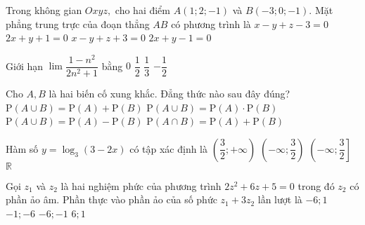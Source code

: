 \begin{ex}%
	Trong không gian $ Oxyz, $ cho hai điểm $ A(1;2;-1) $ và $ B(-3;0;-1) $. Mặt phẳng trung trực của đoạn thẳng $ AB $ có phương trình là
	\choice
	{$ x-y+z-3=0 $}
	{\True $ 2x+y+1=0 $}
	{$ x-y+z+3=0 $}
	{$ 2x+y-1=0 $}
\end{ex}

\begin{ex}%
	Giới hạn $ \lim\dfrac{1-n^2}{2n^2+1}$ bằng
	\choice
	{$ 0 $}
	{$ \dfrac{1}{2} $}
	{$ \dfrac{1}{3} $}
	{\True $ -\dfrac{1}{2} $}
\end{ex}

\begin{ex}%
	Cho $ A,B $ là hai biến cố xung khắc. Đẳng thức nào sau đây đúng?
	\choice
	{\True $ \mathrm{P}(A\cup B)=\mathrm{P}(A)+\mathrm{P}(B) $}
	{$ \mathrm{P}(A\cup B)=\mathrm{P}(A)\cdot\mathrm{P}(B) $}
	{$ \mathrm{P}(A\cup B)=\mathrm{P}(A)-\mathrm{P}(B) $}
	{$ \mathrm{P}(A\cap B)=\mathrm{P}(A)+\mathrm{P}(B) $}
\end{ex}

\begin{ex}%
	Hàm số $ y=\log_3 (3-2x) $ có tập xác định là
	\choice
	{$ \left( \dfrac{3}{2};+\infty \right)  $}
	{\True $\left(-\infty;\dfrac{3}{2} \right) $}
	{$ \left( -\infty;\dfrac{3}{2}\right]  $}
	{$ \mathbb{R} $}
\end{ex}

\begin{ex}%
	Gọi $ z_1 $ và $ z_2 $ là hai nghiệm phức của phương trình $ 2z^2+6z+5=0 $ trong đó $ z_2 $ có phần ảo âm. Phần thực vào phần ảo của số phức $ z_1+3z_2 $ lần lượt là
	\choice
	{$ -6;1 $}
	{$ -1;-6 $}
	{\True $ -6;-1 $}
	{$ 6;1 $}
\end{ex}

